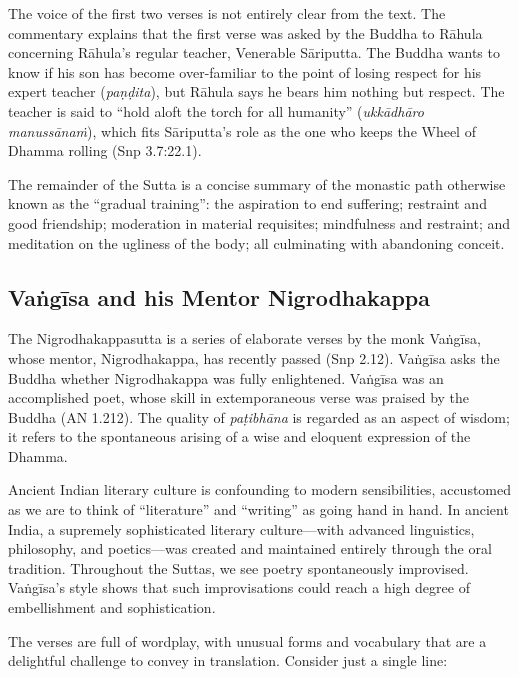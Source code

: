 \documentclass[12pt,openany]{book}%
\begin{document}
The voice of the first two verses is not entirely clear from the text. The commentary explains that the first verse was asked by the Buddha to \textsanskrit{Rāhula} concerning \textsanskrit{Rāhula}’s regular teacher, Venerable \textsanskrit{Sāriputta}. The Buddha wants to know if his son has become over-familiar to the point of losing respect for his expert teacher (\textit{\textsanskrit{paṇḍita}}), but \textsanskrit{Rāhula} says he bears him nothing but respect. The teacher is said to “hold aloft the torch for all humanity” (\textit{\textsanskrit{ukkādhāro} \textsanskrit{manussānaṁ}}), which fits \textsanskrit{Sāriputta}’s role as the one who keeps the Wheel of Dhamma rolling (Snp 3.7:22.1).

The remainder of the Sutta is a concise summary of the monastic path otherwise known as the “gradual training”: the aspiration to end suffering; restraint and good friendship; moderation in material requisites; mindfulness and restraint; and meditation on the ugliness of the body; all culminating with abandoning conceit.

\subsection*{\textsanskrit{Vaṅgīsa} and his Mentor Nigrodhakappa}

The Nigrodhakappasutta is a series of elaborate verses by the monk \textsanskrit{Vaṅgīsa}, whose mentor, Nigrodhakappa, has recently passed (Snp 2.12). \textsanskrit{Vaṅgīsa} asks the Buddha whether Nigrodhakappa was fully enlightened. \textsanskrit{Vaṅgīsa} was an accomplished poet, whose skill in extemporaneous verse was praised by the Buddha (AN 1.212). The quality of \textit{\textsanskrit{paṭibhāna}} is regarded as an aspect of wisdom; it refers to the spontaneous arising of a wise and eloquent expression of the Dhamma.

Ancient Indian literary culture is confounding to modern sensibilities, accustomed as we are to think of “literature” and “writing” as going hand in hand. In ancient India, a supremely sophisticated literary culture—with advanced linguistics, philosophy, and poetics—was created and maintained entirely through the oral tradition. Throughout the Suttas, we see poetry spontaneously improvised. \textsanskrit{Vaṅgīsa}’s style shows that such improvisations could reach a high degree of embellishment and sophistication.

The verses are full of wordplay, with unusual forms and vocabulary that are a delightful challenge to convey in translation. Consider just a single line:
\end{document}

